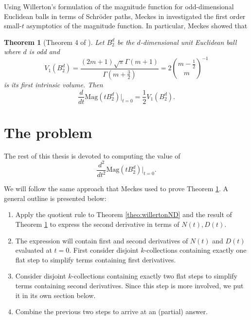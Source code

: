 \documentclass[11pt]{article}
\theoremstyle{mythm}
\newtheorem{theo}[defn]{Theorem}
\begin{document}
Using Willerton's formulation of the magnitude function for odd-dimensional Euclidean balls in terms of Schröder paths, Meckes in \cite{meckes_magnitude_2019} investigated the first order small-$t$ asymptotics of the magnitude function. In particular, Meckes showed that

\begin{theo}[Theorem 4 of \cite{meckes_magnitude_2019}]\label{theo:firstorder}
Let $B_2^d$ be the $d$-dimensional unit Euclidean ball where $d$ is odd and
\begin{equation*}
V_1\left(B_2^d\right) = \frac{(2m+1)\sqrt{\pi}\Gamma(m+1)}{\Gamma\left(m+\frac{3}{2}\right)} = 2\binom{m-\frac{1}{2}}{m}^{-1}
\end{equation*}
is its first intrinsic volume. Then
\begin{equation*}
\frac{d}{dt}\text{Mag}(tB_2^d)\big\vert_{t=0} = \frac{1}{2}V_1(B_2^d).
\end{equation*}
\end{theo}

\section{The problem}

The rest of this thesis is devoted to computing the value of
\begin{equation*}
\frac{d^2}{dt^2}\text{Mag}(tB_2^d)\big\vert_{t=0}.
\end{equation*}

We will follow the same approach that Meckes used to prove Theorem \ref{theo:firstorder}. A general outline is presented below:
\begin{enumerate}[label=\arabic*.]
\item Apply the quotient rule to Theorem \ref{theo:willertonND} and the result of Theorem \ref{theo:firstorder} to express the second derivative in terms of $N(t),D(t)$.
\item The expression will contain first and second derivatives of $N(t)$ and $D(t)$ evaluated at $t = 0$. First consider disjoint $k$-collections containing exactly one flat step to simplify terms containing first derivatives.
\item Consider disjoint $k$-collections containing exactly two flat steps to simplify terms containing second derivatives. Since this step is more involved, we put it in its own section below.
\item Combine the previous two steps to arrive at an (partial) answer.
\end{enumerate}
\end{document}
